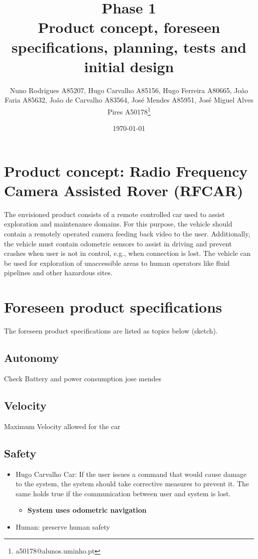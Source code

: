 \documentclass[11pt]{article}
\author{Nuno Rodrigues A85207, Hugo Carvalho A85156, Hugo Ferreira A80665, João Faria A85632, João de Carvalho A83564, José Mendes A85951, José Miguel Alves Pires A50178\thanks{a50178@alunos.uminho.pt}}
\date{\today}
\title{Phase 1\\\medskip
\large Product concept, foreseen specifications, planning, tests and initial design}
\begin{document}
\maketitle
\tableofcontents


\section{Product concept: Radio Frequency Camera Assisted Rover (RFCAR)}
\label{sec:orgf4f2e51}
The envisioned product consists of a remote controlled car used to assist
exploration and maintenance domains. For this purpose, the vehicle should contain a
remotely operated camera feeding back video to the user. Additionally, the
vehicle must contain odometric sensors to assist in driving and prevent
crashes when user is not in control, e.g., when connection is lost.
The vehicle can be used for exploration of unaccessible areas to human operators
like fluid pipelines and other hazardous sites.

\section{Foreseen product specifications}
\label{sec:org942ed5c}
The foreseen product specifications are listed as topics below (sketch).

\subsection{Autonomy}
\label{sec:org7364ba5}
Check Battery and power consumption jose mendes
\subsection{Velocity}
\label{sec:orgb41b31b}
Maximum Velocity allowed for the car
\subsection{Safety}
\label{sec:org4323985}
\begin{itemize}
\item Hugo Carvalho Car: If the user issues a command that would cause damage to the system, the
system should take corrective measures to prevent it. The same holds true if
the communication between user and system is lost.
\begin{itemize}
\item \textbf{System uses odometric navigation}
\end{itemize}
\item Human: preserve human safety
\end{itemize}
\end{document}
